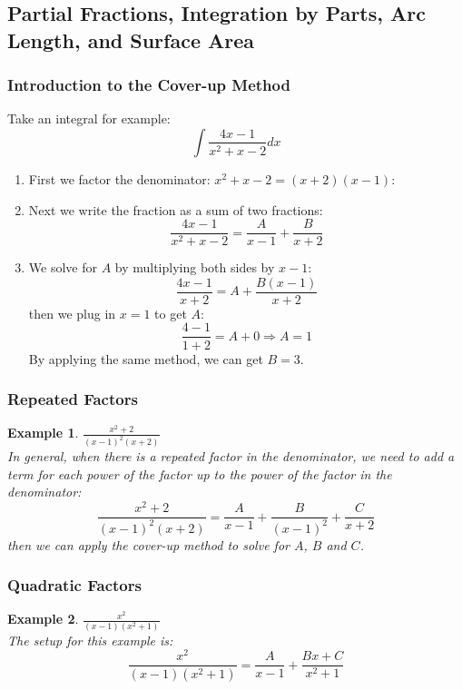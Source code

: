\documentclass[10pt, a4paper]{article}
\newtheorem{example}{Example}
\begin{document}
\subsection{Partial Fractions, Integration by Parts, Arc Length, and Surface Area}

\subsubsection*{Introduction to the Cover-up Method}
Take an integral for example:
\[\int \frac{4x -1}{x^2 + x - 2}dx\]
\begin{enumerate}
    \item First we factor the denominator: $x^2 + x - 2 = (x + 2)(x - 1)$:
    \item Next we write the fraction as a sum of two fractions:
    \[\frac{4x -1}{x^2 + x - 2} = \frac{A}{x - 1} + \frac{B}{x + 2}\]
    \item We solve for $A$ by multiplying both sides by $x - 1$:
    \[ \frac{4x-1}{x+2} = A + \frac{B(x-1)}{x+2} \]
    then we plug in $x = 1$ to get $A$:
    \[\frac{4 - 1}{1 + 2} = A + 0 \Longrightarrow A = 1\]
    By applying the same method, we can get $B = 3$.
\end{enumerate}

\subsubsection*{Repeated Factors}
\begin{example}
    \textbf{$\frac{x^2 + 2}{(x-1)^2 (x+2)}$}\\
    In general, when there is a repeated factor in the denominator, we need to add a term for each power of the factor up to the power of the factor in the denominator:
    \[
        \frac{x^2 + 2}{(x-1)^2 (x+2)} = \frac{A}{x-1} + \frac{B}{(x-1)^2} + \frac{C}{x+2} 
    \]
    then we can apply the cover-up method to solve for $A$, $B$ and $C$.
\end{example}

\subsubsection*{Quadratic Factors}
\begin{example}
    \textbf{$\frac{x^2}{(x-1)(x^2 + 1)}$}\\
    The setup for this example is:
    \[
        \frac{x^2}{(x-1)(x^2 + 1)} = \frac{A}{x-1} + \frac{Bx + C}{x^2 + 1}
    \]
\end{example}
\end{document}
